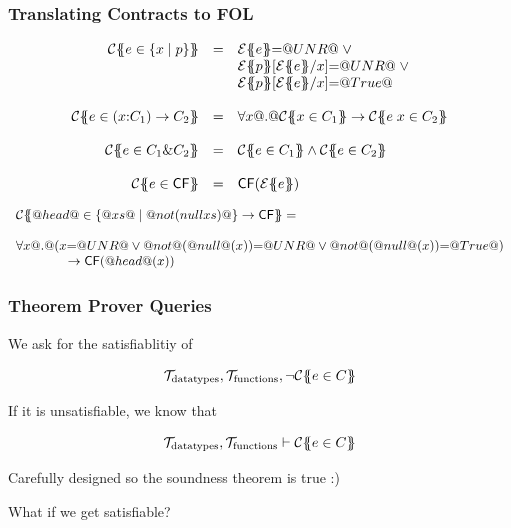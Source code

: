 \documentclass[serif,professionalfont]{beamer}
\begin{document}
\begin{frame}[fragile]
  \frametitle{Translating Contracts to FOL}
  \[\begin{array}{rcl}
  \trc{e \in \{x \mid p \}}
    & = &      \etrans{}{}{e} {=} \unr \; \lor \; \\
    &   &      \etrans{}{}{p}[\etrans{}{}{e}/x] {=} \unr \; \lor \; \\
    &   &      \etrans{}{}{p}[\etrans{}{}{e}/x] {=} \True
  \\ \\
  \trc{e \in (x{:}C_1) \to C_2}
    & = & \formula{\forall x @.@  \trc{x \in C_1} \to \trc{e\;x \in C_2}}
  \\ \\
  \trc{e \in C_1 \& C_2}
     & = & \formula{ \trc{e \in C_1} \land \trc{e \in C_2}}
  \\ \\
  \trc{e \in \cf} & = & \formula{\cf({\etrans{\Sigma}{\Gamma}{e}})} \\
  \end{array}\]

  \[\begin{array}{l}
  {\cal C}\{\!\!\{@head@ \in \{ @xs@ \mid @not (null xs)@ \} \to \mathsf{CF}\}\!\!\} = \\
  \\
  \forall x @.@ (x{=}@UNR@ \lor @not@(@null@(x)){=}@UNR@ \lor @not@(@null@(x)){=}@True@) \\
  \qquad\qquad \to \mathsf{CF}(@head@(x))
  \end{array}\]

\end{frame}

\begin{frame}[fragile]
  \frametitle{Theorem Prover Queries}

  We ask for the satisfiablitiy of

  $$
    \mathcal{T}_{\text{datatypes}}, \mathcal{T}_{\text{functions}} ,
    \neg {\cal C}\{\!\!\{e \in C\}\!\!\}
  $$

  If it is unsatisfiable, we know that

  $$
    \mathcal{T}_{\text{datatypes}}, \mathcal{T}_{\text{functions}} \vdash
    {\cal C}\{\!\!\{e \in C\}\!\!\}
  $$

  Carefully designed so the soundness theorem is true :)

  What if we get satisfiable?

\end{frame}
\end{document}
